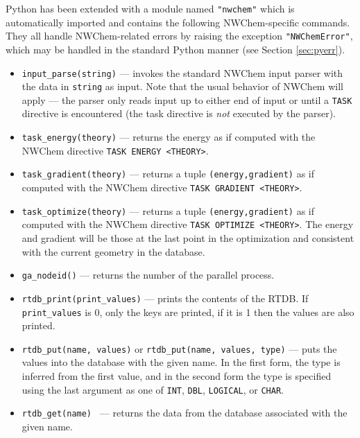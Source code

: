 Python has been extended with a module named \verb+"nwchem"+ which is
automatically imported and contains the following NWChem-specific
commands.  They all handle NWChem-related errors by raising the
exception \verb+"NWChemError"+, which may be handled in the standard
Python manner (see Section \ref{sec:pyerr}). 
\begin{itemize}
\item \verb+input_parse(string)+ --- invokes the standard NWChem input
parser with the data in \verb+string+ as input.  Note that the usual
behavior of NWChem will apply --- the parser only reads input up to
either end of input or until a \verb+TASK+ directive is encountered
(the task directive is {\em not} executed by the parser).

\item \verb+task_energy(theory)+ --- returns the energy as if computed
with the NWChem directive \verb+TASK ENERGY <THEORY>+.

\item \verb+task_gradient(theory)+ --- returns a tuple
\verb+(energy,gradient)+ as if computed with the NWChem
directive \verb+TASK GRADIENT <THEORY>+.

\item \verb+task_optimize(theory)+ --- returns a tuple
\verb+(energy,gradient)+ as if computed with the NWChem
directive \verb+TASK OPTIMIZE <THEORY>+.  The energy and gradient
will be those at the last point in the optimization and consistent
with the current geometry in the database.

\item \verb+ga_nodeid()+ --- returns the number of the parallel
process.

\item \verb+rtdb_print(print_values)+ --- prints the contents of the
RTDB.  If \verb+print_values+ is 0, only the keys are printed, if it
is 1 then the values are also printed.

\item \verb+rtdb_put(name, values)+ or
\verb+rtdb_put(name, values, type)+ --- puts the values into the
database with the given name.  In the first form, the type is inferred
from the first value, and in the second form the type is specified
using the last argument as one of \verb+INT+, \verb+DBL+,
\verb+LOGICAL+, or \verb+CHAR+.

\item \verb+rtdb_get(name) + --- returns the data from the database
associated with the given name.
\end{itemize}

